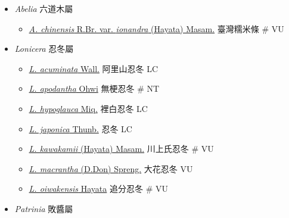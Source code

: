 
  \begin{itemize}
 \item[] \textit{Abelia} 六道木屬
                                
  \begin{itemize}
        \item[] \href{http://www.theplantlist.org/tpl1.1/search?q=Abelia+chinensis+var.+ionandra}{\textit{A. chinensis} R.Br. var. \textit{ionandra} (Hayata) Masam.}   臺灣糯米條  \# VU
  \end{itemize}
 \item[] \textit{Lonicera} 忍冬屬
                                
  \begin{itemize}
        \item[] \href{http://www.theplantlist.org/tpl1.1/search?q=Lonicera+acuminata}{\textit{L. acuminata} Wall.}   阿里山忍冬   LC
        \item[] \href{http://www.theplantlist.org/tpl1.1/search?q=Lonicera+apodantha}{\textit{L. apodantha} Ohwi}   無梗忍冬  \# NT
        \item[] \href{http://www.theplantlist.org/tpl1.1/search?q=Lonicera+hypoglauca}{\textit{L. hypoglauca} Miq.}   裡白忍冬   LC
        \item[] \href{http://www.theplantlist.org/tpl1.1/search?q=Lonicera+japonica}{\textit{L. japonica} Thunb.}   忍冬   LC
        \item[] \href{http://www.theplantlist.org/tpl1.1/search?q=Lonicera+kawakamii}{\textit{L. kawakamii} (Hayata) Masam.}   川上氏忍冬  \# VU
        \item[] \href{http://www.theplantlist.org/tpl1.1/search?q=Lonicera+macrantha}{\textit{L. macrantha} (D.Don) Spreng.}   大花忍冬   VU
        \item[] \href{http://www.theplantlist.org/tpl1.1/search?q=Lonicera+oiwakensis}{\textit{L. oiwakensis} Hayata}   追分忍冬  \# VU
  \end{itemize}
 \item[] \textit{Patrinia} 敗醬屬
                                

\end{itemize}
